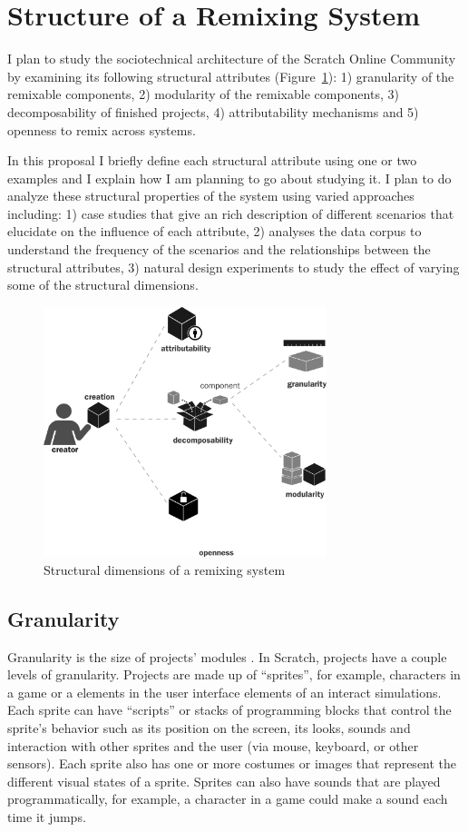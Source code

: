 \section{Structure of a Remixing System} 
I plan to study the sociotechnical architecture of the Scratch Online Community by examining its following structural attributes (Figure~\ref{fig:structure}):
1) granularity of the remixable components, 
2) modularity of the remixable components, 
3) decomposability of finished projects, 
4) attributability mechanisms and 
5) openness to remix across systems.

In this proposal I briefly define each structural attribute using one or two examples and I explain how I am planning to go about studying it.
I plan to do analyze these structural properties of the system using varied approaches including:
1) case studies that give an rich description of different scenarios that elucidate on the influence of each attribute,
2) analyses the data corpus to understand the frequency of the scenarios and the relationships between the structural attributes,
3) natural design experiments to study the effect of varying some of the structural dimensions.

\begin{figure}
\centering
\includegraphics[width=3.25in]{figures/structure.pdf}
\caption{Structural dimensions of a remixing system}
\label{fig:structure}
\end{figure}

\subsection{Granularity}
Granularity is the size of projects' modules \citet{benkler_coases_2002}. 
In Scratch, projects have a couple levels of granularity.
Projects are made up of ``sprites'', for example, characters in a game or a elements in the user interface elements of an interact simulations.
Each sprite can have ``scripts'' or  stacks of programming blocks that control the sprite's behavior such as its position on the screen, its looks, sounds and interaction with other sprites and the user (via mouse, keyboard, or other sensors).
Each sprite also has one or more costumes or images that represent the different visual states of a sprite.
Sprites can also have sounds that are played programmatically, for example, a character in a game could make a sound each time it jumps.

